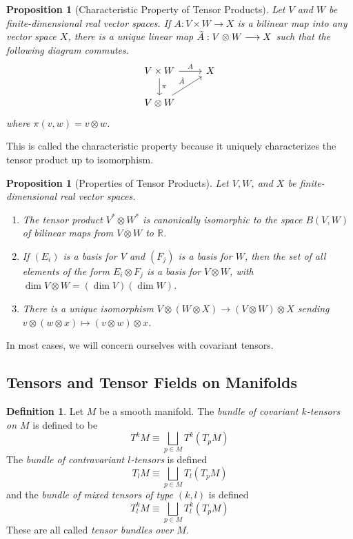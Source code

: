 \documentclass{article}
\newtheorem{proposition}[theorem]{Proposition}
\theoremstyle{remark}
\theoremstyle{definition}
\newtheorem{definition}{Definition}[section]
\begin{document}
    \begin{proposition}[Characteristic Property of Tensor Products]
    Let $V$ and $W$ be finite-dimensional real vector spaces. If $A: V \times W \longrightarrow X$ is a bilinear map into any vector space $X$, there is a unique linear map $\Tilde{A}: V \otimes W \longrightarrow X$ such that the following diagram commutes. 
    \[\begin{tikzcd}
    V \times W \arrow{r}{A} \arrow{d}{\pi} & X \\
    V \otimes W \arrow{ru}{\Tilde{A}}
    \end{tikzcd}\]
    where $\pi(v, w) = v \otimes w$. 
    \end{proposition}

    This is called the characteristic property because it uniquely characterizes the tensor product up to isomorphism. 

    \begin{proposition}[Properties of Tensor Products]
    Let $V, W$, and $X$ be finite-dimensional real vector spaces. 
    \begin{enumerate}
        \item The tensor product $V^* \otimes W^*$ is canonically isomorphic to the space $B(V, W)$ of bilinear maps from $V \otimes W$ to $\mathbb{R}$. 
        \item If $(E_i)$ is a basis for $V$ and $(F_j)$ is a basis for $W$, then the set of all elements of the form $E_i \otimes F_j$ is a basis for $V \otimes W$, with $\dim{V\otimes W} = (\dim{V}) (\dim{W})$. 
        \item There is a unique isomorphism $V \otimes (W \otimes X) \longrightarrow (V \otimes W) \otimes X$ sending $v \otimes (w \otimes x) \mapsto (v \otimes w) \otimes x$. 
    \end{enumerate}
    \end{proposition}

    In most cases, we will concern ourselves with covariant tensors. 

  \subsection{Tensors and Tensor Fields on Manifolds}

    \begin{definition}
    Let $M$ be a smooth manifold. The \textit{bundle of covariant $k$-tensors on $M$} is defined to be 
    \[T^k M \equiv \bigsqcup_{p \in M} T^k (T_p M)\]
    The \textit{bundle of contravariant $l$-tensors} is defined
    \[T_l M \equiv \bigsqcup_{p \in M} T_l (T_p M)\]
    and the \textit{bundle of mixed tensors of type $(k, l)$} is defined
    \[T^k_l M \equiv \bigsqcup_{p \in M} T_l^k (T_p M)\]
    These are all called \textit{tensor bundles over $M$}. 
    \end{definition}
\end{document}
